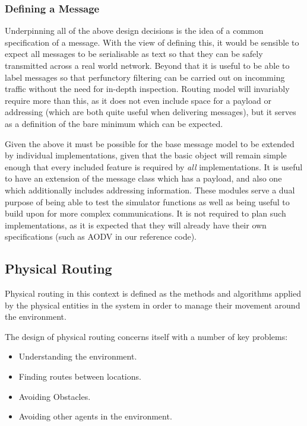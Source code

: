 \subsubsection{Defining a Message}
Underpinning all of the above design decisions is the idea of a common specification of a message. With the view of defining this, it would be sensible to expect all messages to be serialisable as text so that they can be safely transmitted across a real world network. Beyond that it is useful to be able to label messages so that perfunctory filtering can be carried out on incomming traffic without the need for in-depth inspection. Routing model will invariably require more than this, as it does not even include space for a payload or addressing (which are both quite useful when delivering messages), but it serves as a definition of the bare minimum which can be expected. 

Given the above it must be possible for the base message model to be extended by individual implementations, given that the basic object will remain simple enough that every included feature is required by \textit{all} implementations. It is useful to have an extension of the message class which has a payload, and also one which additionally includes addressing information. These modules serve a dual purpose of being able to test the simulator functions as well as being useful to build upon for more complex communications. It is not required to plan such implementations, as it is expected that they will already have their own specifications (such as AODV in our reference code).
		
\subsection{Physical Routing} 

Physical routing in this context is defined as the methods and algorithms applied by the physical entities in the system in order to manage their movement around the environment.

The design of physical routing concerns itself with a number of key problems:
\begin{itemize}
\item Understanding the environment.
\item Finding routes between locations.
\item Avoiding Obstacles.
\item Avoiding other agents in the environment.
\end{itemize}

